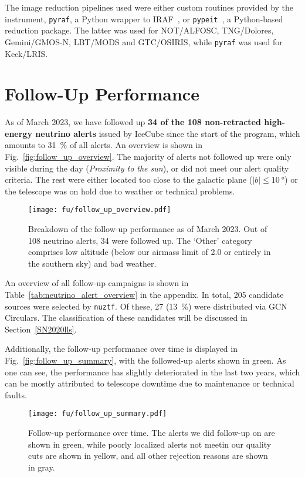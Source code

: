 The image reduction pipelines used were either custom routines provided by the instrument, \texttt{pyraf}, a Python wrapper to IRAF~, or \texttt{pypeit}~, a Python-based reduction package. The latter was used for NOT/ALFOSC, TNG/Dolores, Gemini/GMOS-N, LBT/MODS and GTC/OSIRIS, while \texttt{pyraf} was used for Keck/LRIS.

\section{Follow-Up Performance}
As of March 2023, we have followed up \textbf{34 of the 108 non-retracted high-energy neutrino alerts} issued by IceCube since the start of the program, which amounts to \SI{31}{\percent} of all alerts. An overview is shown in Fig.~\ref{fig:follow_up_overview}. The majority of alerts not followed up were only visible during the day (\textit{Proximity to the sun}), or did not meet our alert quality criteria. The rest were either located too close to the galactic plane ($|b|\leq\SI{10}{\degree}$) or the telescope was on hold due to weather or technical problems.

\begin{figure}[h!]
    \texttt{[image: fu/follow\_up\_overview.pdf]}
    \caption[Follow-up performance]{Breakdown of the follow-up performance as of March 2023. Out of 108 neutrino alerts, 34 were followed up. The `Other' category comprises low altitude (below our airmass limit of 2.0 or entirely in the southern sky) and bad weather.}
\end{figure}

An overview of all follow-up campaigns is shown in Table~\ref{tab:neutrino_alert_overview} in the appendix.
In total, 205 candidate sources were selected by \texttt{nuztf}. Of these, 27 (\SI{13}{\percent}) were distributed via GCN Circulars. The classification of these candidates will be discussed in Section~\ref{SN2020lls}.

Additionally, the follow-up performance over time is displayed in Fig.~\ref{fig:follow_up_summary}, with the followed-up alerts shown in green. As one can see, the performance has slightly deteriorated in the last two years, which can be mostly attributed to telescope downtime due to maintenance or technical faults.

\begin{figure}[h!]
    \texttt{[image: fu/follow\_up\_summary.pdf]}
    \caption[Follow-up performance over time]{Follow-up performance over time. The alerts we did follow-up on are shown in green, while poorly localized alerts not meetin our quality cuts are shown in yellow, and all other rejection reasons are shown in gray.}
\end{figure}

